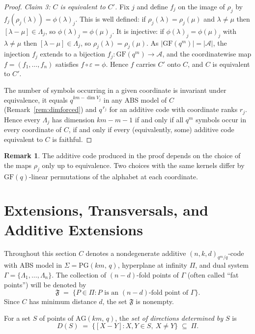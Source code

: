 \documentclass[12pt]{article}
\theoremstyle{definition}
\newtheorem{rem}[thm]{Remark}
\numberwithin{equation}{section}
\newcommand{\A}{\mathcal{A}}
\newcommand{\la}{\lambda}
\newcommand{\GF}[1]{\mathrm{GF}(#1)}
\newcommand{\PG}[2]{\mathrm{PG}(#1,\,#2)}
\newcommand{\AG}[2]{\mathrm{AG}(#1,\,#2)}
\newcommand{\Afold}{\mathfrak{F}}
\begin{document}
\begin{proof}
\smallskip
\noindent\textit{Claim 3: $C$ is equivalent to $C'$.}
Fix $j$ and define $f_j$ on the image of $\rho_j$ by $f_j(\rho_j(\la))=\phi(\la)_j$.  This is well defined: if $\rho_j(\la)=\rho_j(\mu)$ and $\la\ne\mu$ then $[\la-\mu]\in \Lambda_j$, so $\phi(\la)_j=\phi(\mu)_j$.  It is injective: if $\phi(\la)_j=\phi(\mu)_j$ with $\la\neq\mu$ then $[\la-\mu]\in \Lambda_j$, so $\rho_j(\la)=\rho_j(\mu)$.  As $|\GF{q^m}|=|\A|$, the injection $f_j$ extends to a bijection $f_j:\GF{q^m}\to\A$, and the coordinatewise map $f=(f_1,\ldots,f_n)$ satisfies $f\circ\varepsilon=\phi$.  Hence $f$ carries $C'$ onto $C$, and $C$ is equivalent to $C'$.

\smallskip
The number of symbols occurring in a given coordinate is invariant under equivalence, it equals $q^{km-\dim V_j}$ in any ABS model of $C$ (Remark~\ref{rem:dimforced}) and $q^{\,r_j}$ for an additive code with coordinate ranks $r_j$.  Hence every $\Lambda_j$ has dimension $km-m-1$ if and only if all $q^m$ symbols occur in every coordinate of $C$, if and only if every (equivalently, some) additive code equivalent to $C$ is faithful.
\end{proof}

\begin{rem}
The additive code produced in the proof depends on the choice of the maps $\rho_j$ only up to equivalence. Two choices with the same kernels differ by $\GF{q}$-linear permutations of the alphabet at each coordinate.
\end{rem}


\section{Extensions, Transversals, and Additive Extensions}
\label{sec:ext}

Throughout this section $C$ denotes a nondegenerate additive $(n,k,d)_{q^m/q}$-code with ABS model in $\Sigma=\PG{km}{q}$, hyperplane at infinity $\Pi$, and dual system $\Gamma=\{\Lambda_1,\ldots,\Lambda_n\}$.  The collection of $(n-d)$-fold points of $\Gamma$ (often called ``fat points'') will be denoted by
\[
  \Afold \;=\;
  \bigl\{P\in\Pi : P \text{ is an $(n-d)$-fold point of }\Gamma\bigr\}.
\]
Since $C$ has minimum distance $d$, the set $\Afold$ is nonempty.

For a set $S$ of points of $\AG{km}{q}$, the \textit{set of directions determined by $S$} is
\[
  D(S)\;=\;\bigl\{[X-Y] : X,Y\in S,\ X\neq Y\bigr\}\;\subseteq\;\Pi.
\]
\end{document}
